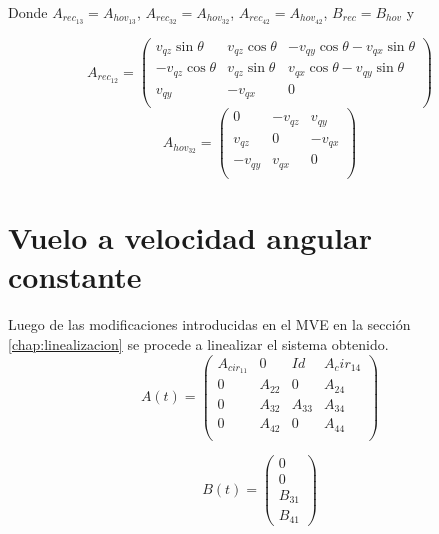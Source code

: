 \documentclass[main]{subfiles}
\begin{document}
Donde $A_{rec_{13}}=A_{hov_{13}}$, $A_{rec_{32}}=A_{hov_{32}}$, $A_{rec_{42}}=A_{hov_{42}}$,    $B_{rec}=B_{hov}$ y 

\begin{equation}
A_{rec_{12}}=\left(\begin{array}{ccc}
v_{qz}\sin\theta & v_{qz}\cos\theta & -v_{qy}\cos\theta-v_{qx}\sin\theta \\
-v_{qz}\cos\theta & v_{qz}\sin\theta & v_{qx}\cos\theta-v_{qy}\sin\theta \\
v_{qy} & -v_{qx} &0\\
\end{array}\right)
\end{equation}
\begin{equation}
A_{hov_{32}}=\left(\begin{array}{ccc}
0 & -v_{qz} & v_{qy} \\
v_{qz} & 0 & -v_{qx}\\
-v_{qy} & v_{qx} &0\\
\end{array}\right)
\end{equation}

\section{Vuelo a velocidad angular constante}
Luego de las modificaciones introducidas en el MVE en la secci\'on \ref{chap:linealizacion} se procede a linealizar el sistema obtenido.
\begin{equation}
A(t)=\left(\begin{array}{cccc}
A_{cir_{11}} & 0 & Id & A{_cir_{14}}  \\
0 & A_{22} & 0      & A_{24}\\
0 & A_{32} & A_{33} & A_{34}\\
0 & A_{42}      & 0      & A_{44} \\    
\end{array}\right)
\end{equation}

\begin{equation}
B(t)=\left(\begin{array}{c}
0\\
0\\
B_{31}\\
B_{41} 
\end{array}\right)
\end{equation}\\
\end{document}

